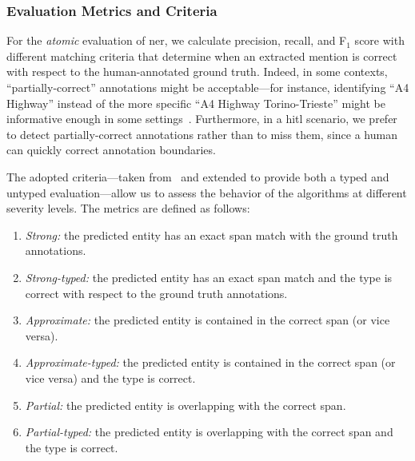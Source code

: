 \subsubsection{Evaluation Metrics and Criteria}\label{sec:metrics}
For the \textit{atomic} evaluation of \ac{ner}, we calculate precision, recall, and F$_1$ score with different matching criteria that determine when an extracted mention is correct with respect to the human-annotated ground truth.
Indeed, in some contexts, ``partially-correct'' annotations might be acceptable---for instance, identifying ``A4 Highway'' instead of the more specific ``A4 Highway Torino-Trieste'' might be informative enough in some settings~\cite{nadeau2007survey, tsai2006various}. Furthermore, in a \ac{hitl} scenario, we prefer to detect partially-correct annotations rather than to miss them, since a human can quickly correct annotation boundaries.


The adopted criteria---taken from~\cite{tsai2006various} and extended to provide both a typed and untyped evaluation---allow us to assess the behavior of the algorithms at different severity levels. The metrics are defined as follows:
\begin{enumerate}
    \item \textit{Strong:} the predicted entity has an exact span match with the ground truth annotations.
    \item \textit{Strong-typed:} the predicted entity has an exact span match and the type is correct with respect to the ground truth annotations.
    \item \textit{Approximate:} the predicted entity is contained in the correct span (or vice versa).
    \item \textit{Approximate-typed:} the predicted entity is contained in the correct span (or vice versa) and the type is correct.
    \item \textit{Partial:} the predicted entity is overlapping with the correct span.
    \item \textit{Partial-typed:} the predicted entity is overlapping with the correct span and the type is correct.
\end{enumerate}


